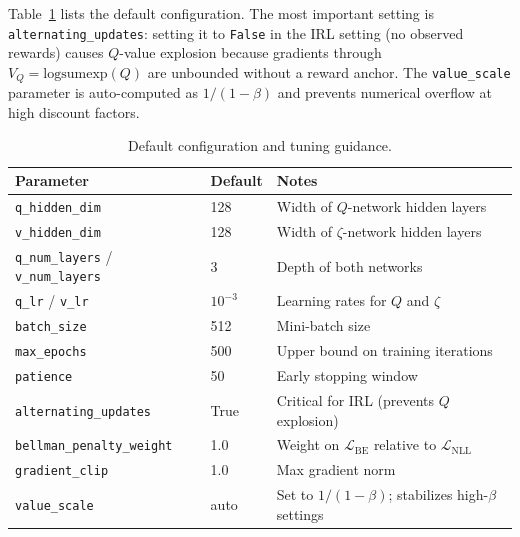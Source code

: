 \documentclass[11pt]{article}
\begin{document}
Table~\ref{tab:hyperparams} lists the default configuration. The most important setting is \texttt{alternating\_updates}: setting it to \texttt{False} in the IRL setting (no observed rewards) causes $Q$-value explosion because gradients through $V_Q = \text{logsumexp}(Q)$ are unbounded without a reward anchor. The \texttt{value\_scale} parameter is auto-computed as $1/(1-\beta)$ and prevents numerical overflow at high discount factors.

\begin{table}[H]
\centering\footnotesize
\caption{Default configuration and tuning guidance.}
\label{tab:hyperparams}
\vspace{-0.5em}
\begin{tabular*}{\textwidth}{@{\extracolsep{\fill}} l l l}
\toprule
Parameter & Default & Notes \\
\midrule
\texttt{q\_hidden\_dim} & 128 & Width of $Q$-network hidden layers \\
\texttt{v\_hidden\_dim} & 128 & Width of $\zeta$-network hidden layers \\
\texttt{q\_num\_layers} / \texttt{v\_num\_layers} & 3 & Depth of both networks \\
\texttt{q\_lr} / \texttt{v\_lr} & $10^{-3}$ & Learning rates for $Q$ and $\zeta$ \\
\texttt{batch\_size} & 512 & Mini-batch size \\
\texttt{max\_epochs} & 500 & Upper bound on training iterations \\
\texttt{patience} & 50 & Early stopping window \\
\texttt{alternating\_updates} & True & Critical for IRL (prevents $Q$ explosion) \\
\texttt{bellman\_penalty\_weight} & 1.0 & Weight on $\mathcal{L}_{\text{BE}}$ relative to $\mathcal{L}_{\text{NLL}}$ \\
\texttt{gradient\_clip} & 1.0 & Max gradient norm \\
\texttt{value\_scale} & auto & Set to $1/(1-\beta)$; stabilizes high-$\beta$ settings \\
\bottomrule
\end{tabular*}
\end{table}
\end{document}
